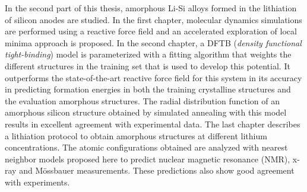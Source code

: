In the second part of this thesis, amorphous Li-Si alloys formed in the 
lithiation of silicon anodes are studied. In the first chapter, molecular 
dynamics simulations are performed using a reactive force field and an accelerated 
exploration of local minima approach is proposed. In the second chapter, a DFTB 
(\textit{density functional tight-binding}) model is parameterized with a fitting 
algorithm that weights the different structures in the training set that is used to develop this potential. It
outperforms the state-of-the-art reactive force field for this system in its 
accuracy in predicting formation energies in both the training crystalline 
structures and the evaluation amorphous structures. The radial distribution 
function of an amorphous silicon structure obtained by simulated annealing with 
this model results in excellent agreement with experimental data. The last 
chapter describes a lithiation protocol to obtain amorphous structures at 
different lithium concentrations. The atomic configurations obtained are analyzed 
with nearest neighbor models proposed here to predict nuclear magnetic resonance (NMR), x-ray and Mössbauer 
measurements. These predictions also show good agreement with experiments.

